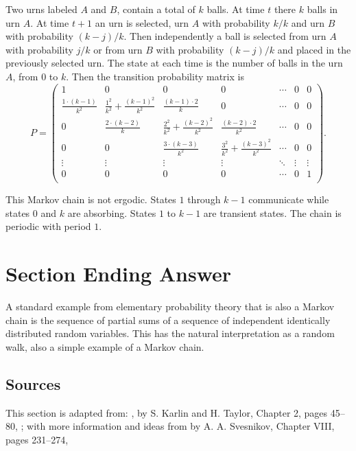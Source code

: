 \documentclass[12pt]{article}
\begin{document}
Two urns labeled \( A \) and \( B \), contain a total of \( k \) balls.
At time \( t \) there \( k \) balls in urn \( A \).  At time \( t + 1 \)
an urn is selected, urn \( A \) with probability \( k/k \) and urn \( B \)
with probability \( (k-j)/k \).  Then independently a ball is selected
from urn \( A \) with probability \( j/k \) or from urn \( B \) with
probability \( (k-j)/k \) and placed in the previously selected urn. The
state at each time is the number of balls in the urn \( A \), from \( 0 \)
to \( k \).  Then the transition probability matrix is
\[
    P =
    \begin{pmatrix}
        1 & 0 & 0 & 0 & \cdots & 0 & 0 \\
        \frac{1 \cdot(k-1)}{k^2} & \frac{1^2}{k^2} +\frac{(k-1)^2}{k^2}
        & \frac{(k-1) \cdot 2 }{k} & 0 & \cdots & 0 & 0 \\
        0 & \frac{2 \cdot (k-2)}{k} & \frac{2^2}{k^{2}} + \frac{(k-2)^2}
        {k^2} & \frac{(k-2) \cdot 2}{k^{2}} & \cdots & 0 & 0 \\
        0 & 0 & \frac{3 \cdot (k-3)}{k^2} & \frac{3^2}{k^{2}} + \frac{(k-3)^2}
        {k^2} & \cdots & 0 & 0 \\
        \vdots & \vdots & \vdots & \vdots & \ddots & \vdots & \vdots \\
        0 & 0 & 0 & 0 & \cdots & 0 & 1 \\
    \end{pmatrix}
    .
\]

This Markov chain is not ergodic.  States \( 1 \) through \( k-1 \)
communicate while states \( 0 \) and \( k \) are absorbing.  States \( 1
\) to \( k-1 \) are transient states.  The chain is periodic with period
\( 1 \).

\section*{Section Ending Answer}

A standard example from elementary probability theory that is also a
Markov chain is the sequence of partial sums of a sequence of
independent identically distributed random variables.  This has the
natural interpretation as a random walk, also a simple example of a
Markov chain.

\subsection*{Sources} This section is adapted from:  , by S. Karlin and H. Taylor, Chapter 2,
pages 45--80,
\cite{karlin75}; with more information and ideas from  by A. A. Svesnikov, Chapter VIII, pages 231--274,
\cite{svesnikov68}
\end{document}
